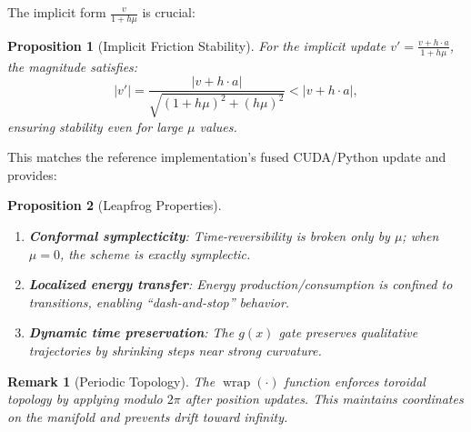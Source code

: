 \documentclass[12pt,letterpaper,twoside]{article}
\newtheorem{remarque}{Remark}[section]
\newtheorem{prop}{Proposition}[section]
\begin{document}
The implicit form $\frac{v}{1 + h\mu}$ is crucial:

\begin{prop}[Implicit Friction Stability]
For the implicit update $v' = \frac{v + h \cdot a}{1 + h\mu}$, the magnitude satisfies:
\[
|v'| = \frac{|v + h \cdot a|}{\sqrt{(1 + h\mu)^2 + (h\mu)^2}} < |v + h \cdot a|,
\]
ensuring stability even for large $\mu$ values.
\end{prop}

This matches the reference implementation's fused CUDA/Python update and provides:

\begin{prop}[Leapfrog Properties]
\begin{enumerate}
\item \textbf{Conformal symplecticity}: Time-reversibility is broken only by $\mu$; when $\mu = 0$, the scheme is exactly symplectic.
\item \textbf{Localized energy transfer}: Energy production/consumption is confined to transitions, enabling ``dash-and-stop'' behavior.
\item \textbf{Dynamic time preservation}: The $g(x)$ gate preserves qualitative trajectories by shrinking steps near strong curvature.
\end{enumerate}
\end{prop}

\begin{remarque}[Periodic Topology]
The $\operatorname{wrap}(\cdot)$ function enforces toroidal topology by applying modulo $2\pi$ after position updates. This maintains coordinates on the manifold and prevents drift toward infinity.
\end{remarque}
\end{document}

